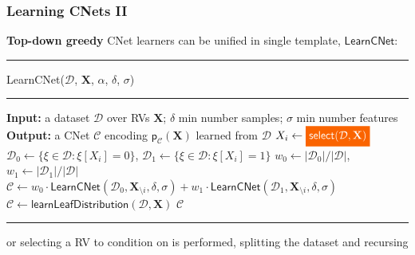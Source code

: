 \documentclass[xcolor={usenames,dvipsnames,svgnames}, compress]{beamer}
\newcommand{\highlight}[2][yellow]{\mathchoice%
  {\colorbox{#1}{\strut\textcolor{white}{$\displaystyle{#2}$}}}%
  {\colorbox{#1}{\strut\textcolor{white}{$\textstyle{#2}$}}}%
  {\colorbox{#1}{\strut\textcolor{white}{$\scriptstyle{#2}$}}}%
  {\colorbox{#1}{\strut\textcolor{white}{$\scriptscriptstyle{#2}$}}}}%
\begin{document}
\begin{frame}[t]
  \frametitle{Learning CNets II}
  \small
      \textbf{Top-down greedy} CNet learners %
    can be unified in single template, $\mathsf{LearnCNet}$:\vspace{-10pt}
 \begin{center}  
  \begin{minipage}{0.9\linewidth}
    \vspace{10pt}
        \scriptsize
        {\hrule\flushleft\textsf{LearnCNet}($\mathcal{D}$, $\mathbf{X}$, $\alpha$,
        $\delta$, $\sigma$)\\\hrule}
  \begin{algorithmic}[1]
    \State \textbf{Input:} a dataset $\mathcal{D}$ over RVs $\mathbf{X}$;  $\delta$
    min number samples; $\sigma$ min number features
    \State  \textbf{Output:}  a CNet $\mathcal{C}$ encoding  $\mathsf{p}_{\mathcal{C}}(\mathbf{X})$ learned from $\mathcal D$
    \State $X_i\leftarrow  \highlight[gold4]{\mathsf{select}(\mathcal D, \mathbf X)}$
    \State $\mathcal D_0 \leftarrow \{\xi \in \mathcal D: \xi[X_i]=0 \}$, $\mathcal D_1 \leftarrow \{\xi \in \mathcal D: \xi[X_i]=1 \}$
    \State $w_0 \leftarrow |\mathcal D_0| / |\mathcal D|$, $w_1 \leftarrow |\mathcal   D_1| / |\mathcal D|$
    \State $\mathcal{C} \leftarrow
    w_0\cdot\mathsf{LearnCNet}(\mathcal D_0, \mathbf X_{\setminus i},
     \delta, \sigma) + w_1 \cdot\mathsf{LearnCNet}(\mathcal D_1, \mathbf X_{\setminus i}, \delta, \sigma) $
    \Else 
    \State $\mathcal{C} \leftarrow \mathsf{learnLeafDistribution}(\mathcal D, \mathbf X)$
    \EndIf
    \State \Return $\mathcal{C}$
  \end{algorithmic}
  \hrule
\end{minipage}
\end{center}
\vspace{10pt}
  \small
  or selecting a RV to condition on is performed, splitting the
  dataset and recursing
\end{frame}
\end{document}
